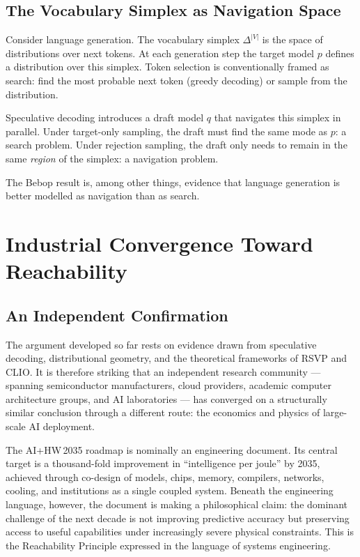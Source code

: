 \documentclass[11pt, a4paper, openany]{book}
\theoremstyle{plain}
\theoremstyle{definition}
\theoremstyle{remark}
\begin{document}
\section{The Vocabulary Simplex as Navigation Space}

Consider language generation.
The vocabulary simplex $\Delta^{|V|}$ is the space of distributions over
next tokens.
At each generation step the target model $p$ defines a distribution over
this simplex.
Token selection is conventionally framed as search: find the most probable
next token (greedy decoding) or sample from the distribution.

Speculative decoding introduces a draft model $q$ that navigates this simplex
in parallel.
Under target-only sampling, the draft must find the same mode as $p$:
a search problem.
Under rejection sampling, the draft only needs to remain in the same
\emph{region} of the simplex: a navigation problem.

The Bebop result \cite{li2026breaking} is, among other things, evidence that
language generation is better modelled as navigation than as search.

\chapter{Industrial Convergence Toward Reachability}
\label{ch:industry}

\section{An Independent Confirmation}

The argument developed so far rests on evidence drawn from speculative decoding,
distributional geometry, and the theoretical frameworks of RSVP and CLIO.
It is therefore striking that an independent research community --- spanning
semiconductor manufacturers, cloud providers, academic computer architecture
groups, and AI laboratories --- has converged on a structurally similar
conclusion through a different route: the economics and physics of large-scale
AI deployment.

The AI+HW\,2035 roadmap \cite{chen2026aihw2035} is nominally an engineering
document.
Its central target is a thousand-fold improvement in ``intelligence per joule''
by 2035, achieved through co-design of models, chips, memory, compilers,
networks, cooling, and institutions as a single coupled system.
Beneath the engineering language, however, the document is making a
philosophical claim: the dominant challenge of the next decade is not
improving predictive accuracy but preserving access to useful capabilities
under increasingly severe physical constraints.
This is the Reachability Principle expressed in the language of systems
engineering.
\end{document}

